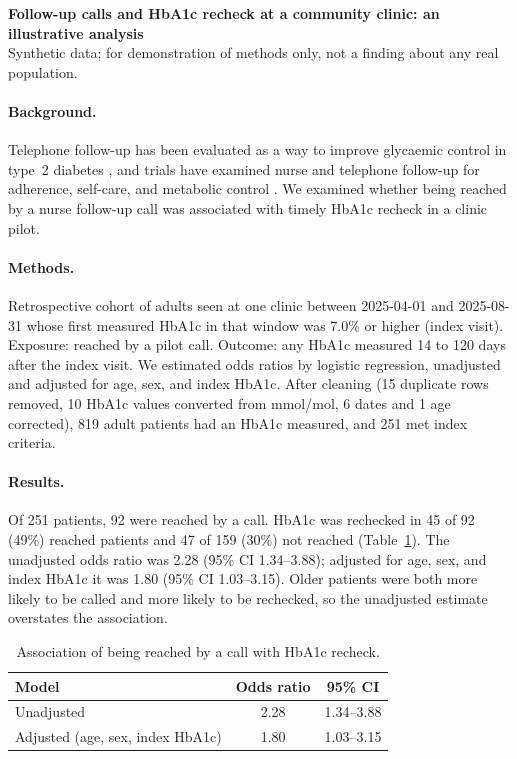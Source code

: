 \documentclass[10pt]{article}
\begin{document}
\begin{center}{\large\bfseries Follow-up calls and HbA1c recheck at a community clinic: an illustrative analysis}\\[2pt]
{\small Synthetic data; for demonstration of methods only, not a finding about any real population.}\end{center}

\paragraph{Background.} Telephone follow-up has been evaluated as a way to improve glycaemic control in type~2 diabetes \citep{Wu2010_20950378}, and trials have examined nurse and telephone follow-up for adherence, self-care, and metabolic control \citep{Wong2005_15842446,Nesari2010_21092015,AytekinKanadli2016_26871245}. We examined whether being reached by a nurse follow-up call was associated with timely HbA1c recheck in a clinic pilot.

\paragraph{Methods.} Retrospective cohort of adults seen at one clinic between 2025-04-01 and 2025-08-31 whose first measured HbA1c in that window was 7.0\% or higher (index visit). Exposure: reached by a pilot call. Outcome: any HbA1c measured 14 to 120 days after the index visit. We estimated odds ratios by logistic regression, unadjusted and adjusted for age, sex, and index HbA1c. After cleaning (15 duplicate rows removed, 10 HbA1c values converted from mmol/mol, 6 dates and 1 age corrected), 819 adult patients had an HbA1c measured, and 251 met index criteria.

\paragraph{Results.} Of 251 patients, 92 were reached by a call. HbA1c was rechecked in 45 of 92 (49\%) reached patients and 47 of 159 (30\%) not reached (Table~\ref{tab:or}). The unadjusted odds ratio was 2.28 (95\% CI 1.34--3.88); adjusted for age, sex, and index HbA1c it was 1.80 (95\% CI 1.03--3.15). Older patients were both more likely to be called and more likely to be rechecked, so the unadjusted estimate overstates the association.

\begin{table}[h]\centering\caption{Association of being reached by a call with HbA1c recheck.}\label{tab:or}
\begin{tabular}{lcc}\toprule
Model & Odds ratio & 95\% CI\\\midrule
Unadjusted & 2.28 & 1.34--3.88\\
Adjusted (age, sex, index HbA1c) & 1.80 & 1.03--3.15\\\bottomrule\end{tabular}\end{table}
\end{document}
